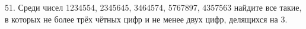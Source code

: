 51. Среди чисел 1234554, 2345645, 3464574, 5767897, 4357563 найдите все такие, в которых не более трёх чётных цифр и не менее двух цифр, делящихся на 3.\\

